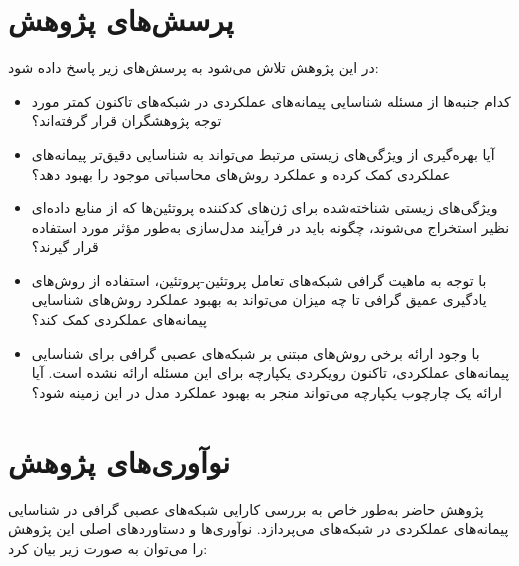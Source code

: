 \section{پرسش‌های پژوهش}

در این پژوهش تلاش می‌شود به پرسش‌های زیر پاسخ داده شود:

\begin{itemize}
	\item کدام جنبه‌ها از مسئله شناسایی پیمانه‌های عملکردی در شبکه‌های  تاکنون کمتر مورد توجه پژوهشگران قرار گرفته‌اند؟
	
	\item آیا بهره‌گیری از ویژگی‌های زیستی مرتبط می‌تواند به شناسایی دقیق‌تر پیمانه‌های عملکردی کمک کرده و عملکرد روش‌های محاسباتی موجود را بهبود دهد؟
	
	\item ویژگی‌های زیستی شناخته‌شده برای ژن‌های کدکننده پروتئین‌ها که از منابع داده‌ای نظیر  استخراج می‌شوند، چگونه باید در فرآیند مدل‌سازی به‌طور مؤثر مورد استفاده قرار گیرند؟
	
	\item با توجه به ماهیت گرافی شبکه‌های تعامل پروتئین-پروتئین، استفاده از روش‌های یادگیری عمیق گرافی تا چه میزان می‌تواند به بهبود عملکرد روش‌های شناسایی پیمانه‌های عملکردی کمک کند؟
	
	\item با وجود ارائه برخی روش‌های مبتنی بر شبکه‌های عصبی گرافی برای شناسایی پیمانه‌های عملکردی، تاکنون رویکردی یکپارچه برای این مسئله ارائه نشده است. آیا ارائه یک چارچوب یکپارچه می‌تواند منجر به بهبود عملکرد مدل در این زمینه شود؟
\end{itemize}


\section{نوآوری‌های پژوهش}
پژوهش حاضر به‌طور خاص به بررسی کارایی شبکه‌های عصبی گرافی در شناسایی پیمانه‌های عملکردی در شبکه‌های  می‌پردازد. نوآوری‌ها و دستاوردهای اصلی این پژوهش را می‌توان به صورت زیر بیان کرد:

